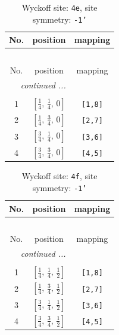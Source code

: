 \documentclass[fleqn,8pt]{jsarticle}
\begin{document}
\begin{longtable}{ccc}
\caption{Wyckoff site: {\tt 4e}, site symmetry: {\tt -1'}}
 \\
 \hline \hline
No. & position & mapping \\ \hline \endfirsthead

\multicolumn{2}{l}{\tablename\ \thetable{}} \\
 \hline \hline
No. & position & mapping \\ \hline \endhead

 \hline \hline
\multicolumn{2}{r}{\footnotesize\it continued ...} \\ \endfoot

 \hline \hline
\multicolumn{2}{r}{} \\ \endlastfoot

1 & $\left[ \frac{1}{4},\, \frac{1}{4},\, 0 \right]$ & {\tt [1,8]} \\ \hline
2 & $\left[ \frac{1}{4},\, \frac{3}{4},\, 0 \right]$ & {\tt [2,7]} \\ \hline
3 & $\left[ \frac{3}{4},\, \frac{1}{4},\, 0 \right]$ & {\tt [3,6]} \\ \hline
4 & $\left[ \frac{3}{4},\, \frac{3}{4},\, 0 \right]$ & {\tt [4,5]} \\
\end{longtable}
\renewcommand{\arraystretch}{1.2}
\begin{longtable}{ccc}
\caption{Wyckoff site: {\tt 4f}, site symmetry: {\tt -1'}}
 \\
 \hline \hline
No. & position & mapping \\ \hline \endfirsthead

\multicolumn{2}{l}{\tablename\ \thetable{}} \\
 \hline \hline
No. & position & mapping \\ \hline \endhead

 \hline \hline
\multicolumn{2}{r}{\footnotesize\it continued ...} \\ \endfoot

 \hline \hline
\multicolumn{2}{r}{} \\ \endlastfoot

1 & $\left[ \frac{1}{4},\, \frac{1}{4},\, \frac{1}{2} \right]$ & {\tt [1,8]} \\ \hline
2 & $\left[ \frac{1}{4},\, \frac{3}{4},\, \frac{1}{2} \right]$ & {\tt [2,7]} \\ \hline
3 & $\left[ \frac{3}{4},\, \frac{1}{4},\, \frac{1}{2} \right]$ & {\tt [3,6]} \\ \hline
4 & $\left[ \frac{3}{4},\, \frac{3}{4},\, \frac{1}{2} \right]$ & {\tt [4,5]} \\
\end{longtable}
\end{document}
